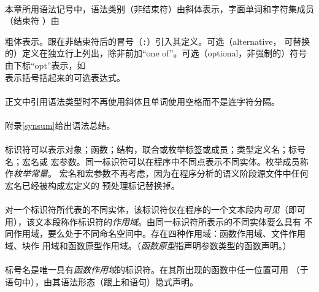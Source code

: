 
\paragraph{}
本章所用语法记号中，语法类别（非结束符）由斜体表示，字面单词和字符集成员（结束符
）由{粗体表示。跟在非结束符后的冒号（\texttt{:}）引入其定义。可选（alternative，
可替换的）定义在独立行上列出，除非前加``one of''。可选（optional，非强制的）符号
由下标``opt''表示，如                                                         \\
表示括号括起来的可选表达式。

\paragraph{}
正文中引用语法类型时不再使用斜体且单词使用空格而不是连字符分隔。

\paragraph{}
附录\ref{synsum}给出语法总结。


\paragraph{}
标识符可以表示对象；函数；结构，联合或枚举标签或成员；类型定义名；标号名；宏名或
宏参数。同一标识符可以在程序中不同点表示不同实体。枚举成员称作\textit{枚举常量}。
宏名和宏参数不再考虑，因为在程序分析的语义阶段源文件中任何宏名已经被构成宏定义的
预处理标记替换掉。

\paragraph{}
对一个标识符所代表的不同实体，该标识符仅在程序的一个文本段内\textit{可见}（即可
用），该文本段称作标识符的\textit{作用域}。由同一标识符所表示的不同实体要么具有
不同作用域，要么处于不同命名空间中。存在四种作用域：函数作用域、文件作用域、块作
用域和函数原型作用域。（\textit{函数原型}指声明参数类型的函数声明。）

\paragraph{}
标号名是唯一具有\textit{函数作用域}的标识符。在其所出现的函数中任一位置可用
（于语句中），由其语法形态（跟上\tm{:}和语句）隐式声明。

}

